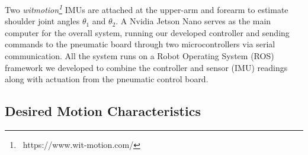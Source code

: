 \documentclass[letterpaper, 10pt, conference]{ieeeconf}      %
\begin{document}
Two \textit{witmotion\footnote{~https://www.wit-motion.com/}} IMUs are attached at the upper-arm and forearm to estimate shoulder joint angles $\theta_1$ and $\theta_2$. A Nvidia Jetson Nano serves as the main computer for the overall system, running our developed controller and sending commands to the pneumatic board through two microcontrollers via serial communication. All the system runs on a Robot Operating System (ROS) framework we developed to combine the controller and sensor (IMU) readings along with actuation from the pneumatic control board.





\subsection{Desired Motion Characteristics}
\end{document}
